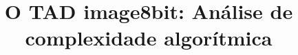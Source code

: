 \documentclass[11pt,a4paper]{report}
\title{O TAD image8bit: Análise de complexidade algorítmica}
\begin{document}


\begingroup
\let\clearpage\relax



\endgroup
\end{document}
